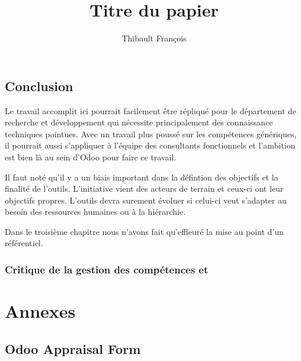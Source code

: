 \documentclass[a4paper,10pt]{report}
\begin{document}
\title  {Titre du papier}
\author  {Thibault François }
\maketitle

\tableofcontents  %

 
 


 

\chapter{Conclusion}
Le travail accomplit ici pourrait facilement être répliqué pour le département de recherche et développement qui nécessite principalement des connaissance techniques pointues. Avec un travail plus poussé sur les compétences génériques, il pourrait aussi s'appliquer à l'équipe des consultants fonctionnels et l'ambition est bien là au sein d'Odoo pour faire ce travail. 

Il faut noté qu'il y a un biais important dans la défintion des objectifs et la finalité de l'outils. L'initiative vient des acteurs de terrain et ceux-ci ont leur objectifs propres. L'outils devra surement évoluer si celui-ci veut s'adapter au besoin des ressources humaines ou à la hiérarchie. 

Dans le troisième chapitre nous n'avons fait qu'effleuré la mise au point d'un référentiel.
\section{Critique de la gestion des compétences et }







\label{Bibliographie}
\lhead{\nouppercase{\leftmark}}
 



\part*{Annexes}
\lhead{\nouppercase{\leftmark}}
\appendix %

\chapter{Odoo Appraisal Form}





\end{document}

